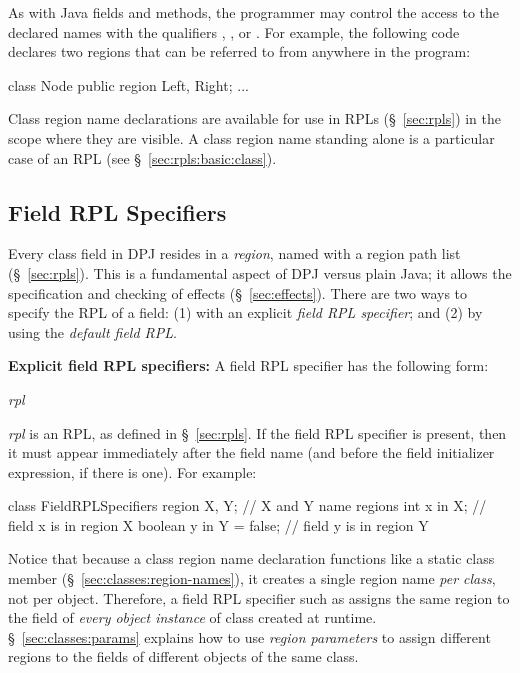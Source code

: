 As with Java fields and methods, the programmer may control the access
to the declared names with the qualifiers , ,
or .  For example, the following code declares two
regions that can be referred to from anywhere in the program:

\begin{dpjlisting}
class Node {
	public region Left, Right;
	...
}
\end{dpjlisting}

Class region name declarations are available for use in RPLs
(\S~\ref{sec:rpls}) in the scope where they are visible.  A class
region name standing alone is a particular case of an RPL (see
\S~\ref{sec:rpls:basic:class}).

\subsection{Field RPL Specifiers%
\label{sec:classes:field-region-spec}}

Every class field in DPJ resides in a \emph{region}, named with a
region path list (\S~\ref{sec:rpls}).  This is a fundamental aspect of
DPJ versus plain Java; it allows the specification and checking of
effects (\S~\ref{sec:effects}). There are two ways to specify the RPL
of a field: (1) with an explicit \emph{field RPL specifier}; and (2)
by using the \emph{default field RPL}.

\noindent
\textbf{Explicit field RPL specifiers:} A field RPL specifier has the
following form:
%
\begin{description}
\item {} \emph{rpl}
\end{description}
%
\emph{rpl} is an RPL, as defined in \S~\ref{sec:rpls}.  If the field
RPL specifier is present, then it must appear immediately after the
field name (and before the field initializer expression, if there is
one).  For example:
%
\begin{dpjlisting}
class FieldRPLSpecifiers {
    region X, Y;             // X and Y name regions
    int x in X;              // field x is in region X
    boolean y in Y = false;  // field y is in region Y
}
\end{dpjlisting}
%
Notice that because a class region name declaration functions like a
static class member (\S~\ref{sec:classes:region-names}), it creates a
single region name \emph{per class}, not per object.  Therefore, a
field RPL specifier such as  assigns the same
region  to the field of \emph{every object
  instance} of class  created at runtime.
\S~\ref{sec:classes:params} explains how to use \emph{region
  parameters} to assign different regions to the fields of different
objects of the same class.

